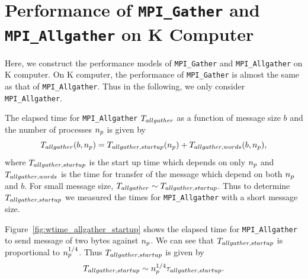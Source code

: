 \documentclass[dvipdfmx]{pasj01}
\begin{document}


\section{Performance of {\tt MPI\_Gather} and {\tt MPI\_Allgather} on K Computer}
\label{sec:allgather}

Here, we construct the performance models of {\tt MPI\_Gather} and
{\tt MPI\_Allgather} on K computer. On K computer, the performance of
{\tt MPI\_Gather} is almost the same as that of {\tt MPI\_Allgather}.
Thus in the following, we only consider {\tt MPI\_Allgather}.

The elapsed time for {\tt MPI\_Allgather} $T_{\rm allgather}$ as a
function of message size $b$ and the number of processes $n_{\rm p}$
is given by
\begin{equation}
  T_{\rm allgather} (b, n_{\rm p}) = T_{\rm allgather, startup} (n_{\rm p}) + T_{\rm allgather, words} (b, n_{\rm p}),
\end{equation}
where $T_{\rm allgather, startup}$ is the start up time which depends
on only $n_{\rm p}$ and $T_{\rm allgather, words}$ is the time for
transfer of the message which depend on both $n_{\rm p}$ and $b$. For
small message size, $T_{\rm allgather} \sim T_{\rm allgather,
  startup}$. Thus to determine $T_{\rm allgather, startup}$ we
measured the times for {\tt MPI\_Allgather} with a short message size.

Figure~\ref{fig:wtime_allgather_startup} shows the elapsed time for
{\tt MPI\_Allgather} to send message of two bytes against $n_{\rm
  p}$. We can see that $T_{\rm allgather, startup}$ is proportional to
$n_{\rm p}^{1/4}$. Thus $T_{\rm allgather, startup}$ is given by
\begin{equation}
  T_{\rm allgather, startup} \sim n^{1/4}_{\rm p} \tau_{\rm allgather, startup}.
\end{equation}
\end{document}
